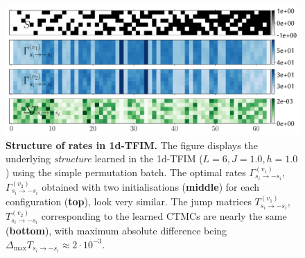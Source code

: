 \begin{figure}[t]
	\centering
	\includegraphics[width=\linewidth]{Chapter5/Figs/Vector/rate_structure.pdf}
	\caption[Structure of learned rates for 1d-TFIM]{\textbf{Structure of rates in 1d-TFIM.} The figure displays the underlying \emph{structure} learned in the 1d-TFIM ($L=6, J=1.0, h=1.0$) using the simple permutation batch. The optimal rates $\Gamma^{(v_1)}_{s_i \rightarrow -s_i}$, $\Gamma^{(v_2)}_{s_i \rightarrow -s_i}$ obtained with two initialisations (\textbf{middle}) for each configuration (\textbf{top}), look very similar. The jump matrices $T^{(v_1)}_{s_i \rightarrow -s_i}$, $T^{(v_2)}_{s_i \rightarrow -s_i}$ corresponding to the learned CTMCs are nearly the same (\textbf{bottom}), with maximum absolute difference being $\Delta_{\text{max}} T_{s_i \rightarrow -s_i} \approx 2\cdot10^{-3}$.}
	\label{fig:rate_structure}
\end{figure}

